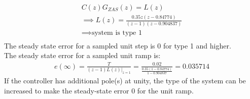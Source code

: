 \documentclass[12pt]{article}
\newenvironment{problem}[2][Problem]{\begin{trivlist}
\item[\hskip \labelsep {\bfseries #1}\hskip \labelsep {\bfseries #2.}]}{\end{trivlist}}
\begin{document}
\begin{problem}{1}
\begin{enumerate}[label=(\alph*)]
        \begin{align*}
            C(z)G_{ZAS}(z) = L(z)\\
            \implies L(z) = \frac{0.35z(z-0.84774)}{(z-1)(z-0.904837)}\\
            \implies \text{system is type 1}\\
        \end{align*}
        The steady state error for a sampled unit step is 0 for type 1 and higher.\\
        The steady state error for a sampled unit ramp is:
        \begin{align*}
            e(\infty) = \frac{T}{(z-1)L(z)|_{z=1}} = \frac{0.02}{\frac{0.35(1-0.84774)}{1-0.904837}} = 0.035714
        \end{align*}
        If the controller has additional pole(s) at unity, the type of the system can be increased to make the steady-state error 0 for the unit ramp.
    \end{enumerate}
\end{problem}
\pagebreak
\end{document}
